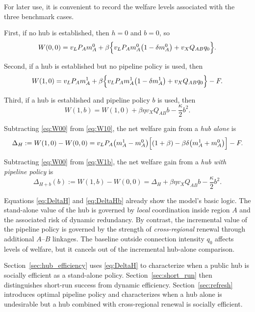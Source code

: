 For later use, it is convenient to record the welfare levels associated with the three benchmark cases.

First, if no hub is established, then $h=0$ and $b=0$, so
\begin{equation}
W(0,0)
=
v_L P_A m_A^0
+
\beta\Bigl\{v_L P_A m_A^0\bigl(1-\delta m_A^0\bigr) + v_X Q_{AB} q_0\Bigr\}.
\label{eq:W00}
\end{equation}

Second, if a hub is established but no pipeline policy is used, then
\begin{equation}
W(1,0)
=
v_L P_A m_A^1
+
\beta\Bigl\{v_L P_A m_A^1\bigl(1-\delta m_A^1\bigr) + v_X Q_{AB} q_0\Bigr\}
-F.
\label{eq:W10}
\end{equation}

Third, if a hub is established and pipeline policy $b$ is used, then
\begin{equation}
W(1,b)
=
W(1,0)
+
\beta\eta v_X Q_{AB} b
-
\frac{\kappa}{2}b^2.
\label{eq:W1b}
\end{equation}

Subtracting \eqref{eq:W00} from \eqref{eq:W10}, the net welfare gain from a \emph{hub alone} is
\begin{equation}
\Delta_H
:=
W(1,0)-W(0,0)
=
v_L P_A \bigl(m_A^1-m_A^0\bigr)\Bigl[(1+\beta)-\beta\delta\bigl(m_A^1+m_A^0\bigr)\Bigr]-F.
\label{eq:DeltaH}
\end{equation}

Subtracting \eqref{eq:W00} from \eqref{eq:W1b}, the net welfare gain from a \emph{hub with pipeline policy} is
\begin{equation}
\Delta_{H+b}(b)
:=
W(1,b)-W(0,0)
=
\Delta_H
+
\beta\eta v_X Q_{AB} b
-
\frac{\kappa}{2}b^2.
\label{eq:DeltaHb}
\end{equation}

Equations \eqref{eq:DeltaH} and \eqref{eq:DeltaHb} already show the model's basic logic. The stand-alone value of the hub is governed by \emph{local} coordination inside region $A$ and the associated risk of dynamic redundancy. By contrast, the incremental value of the pipeline policy is governed by the strength of \emph{cross-regional} renewal through additional $A$--$B$ linkages. The baseline outside connection intensity $q_0$ affects levels of welfare, but it cancels out of the incremental hub-alone comparison.

Section~\ref{sec:hub_efficiency} uses \eqref{eq:DeltaH} to characterize when a public hub is socially efficient as a stand-alone policy. Section~\ref{sec:short_run} then distinguishes short-run success from dynamic efficiency. Section~\ref{sec:refresh} introduces optimal pipeline policy and characterizes when a hub alone is undesirable but a hub combined with cross-regional renewal is socially efficient.
